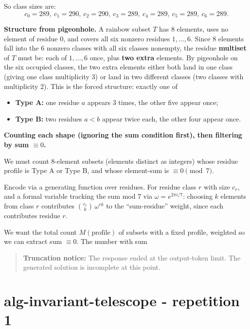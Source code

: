 \documentclass[
  11pt,
  letterpaper,
]{article}
\providecommand{\tightlist}{%
  \setlength{\itemsep}{0pt}\setlength{\parskip}{0pt}}
\begin{document}
So class sizes are:
\[c_0=289,\ c_1=290,\ c_2=290,\ c_3=289,\ c_4=289,\ c_5=289,\ c_6=289.\]

\textbf{Structure from pigeonhole.} A rainbow subset \(T\) has \(8\)
elements, uses no element of residue \(0\), and covers all six nonzero
residues \(1,\dots,6\). Since \(8\) elements fall into the \(6\) nonzero
classes with all six classes nonempty, the residue \textbf{multiset} of
\(T\) must be: each of \(1,\dots,6\) once, plus \textbf{two extra}
elements. By pigeonhole on the six occupied classes, the two extra
elements either both land in one class (giving one class multiplicity
\(3\)) or land in two different classes (two classes with multiplicity
\(2\)). This is the forced structure: exactly one of

\begin{itemize}
\tightlist
\item
  \textbf{Type A:} one residue \(a\) appears \(3\) times, the other five
  appear once;
\item
  \textbf{Type B:} two residues \(a<b\) appear twice each, the other
  four appear once.
\end{itemize}

\textbf{Counting each shape (ignoring the sum condition first), then
filtering by sum \(\equiv 0\).}

We must count \(8\)-element subsets (elements distinct as integers)
whose residue profile is Type A or Type B, and whose element-sum is
\(\equiv 0 \pmod 7\).

Encode via a generating function over residues. For residue class \(r\)
with size \(c_r\), and a formal variable tracking the sum mod \(7\) via
\(\omega = e^{2\pi i/7}\): choosing \(k\) elements from class \(r\)
contributes \(\binom{c_r}{k}\,\omega^{rk}\) to the ``sum-residue''
weight, since each contributes residue \(r\).

We want the total count \(M(\text{profile})\) of subsets with a fixed
profile, weighted so we can extract sum \(\equiv 0\). The number with
sum

\begin{quote}
\textbf{Truncation notice:} The response ended at the output-token
limit. The generated solution is incomplete at this point.
\end{quote}

\clearpage

\section{alg-invariant-telescope - repetition
1}\label{alg-invariant-telescope---repetition-1}
\end{document}
